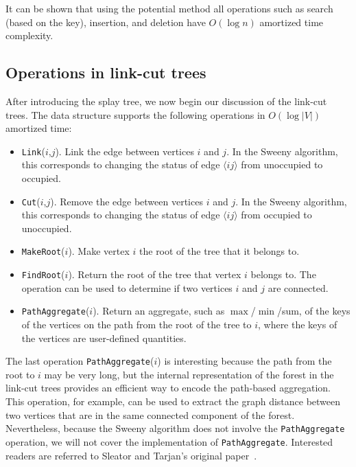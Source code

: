 It can be shown that using the potential method \cite{Leiserson1994} all operations such as search (based on the key), insertion, and deletion have $O(\log n)$ 
amortized time complexity\cite{Sleator1985}.

\subsection{Operations in link-cut trees}
After introducing the splay tree, we now begin our discussion of the link-cut trees. The data structure supports the following operations in $O(\log |V|)$ amortized time:
\begin{itemize}
  \item \texttt{Link}($i$,$j$). Link the edge between vertices $i$ and $j$. In the Sweeny algorithm, this corresponds to changing the status of edge 
  $\langle ij \rangle$ from unoccupied to occupied.
  \item \texttt{Cut}($i$,$j$).  Remove the edge between vertices $i$ and $j$. In the Sweeny algorithm, this corresponds to changing the status of edge 
  $\langle ij \rangle$ from occupied to unoccupied.
  \item \texttt{MakeRoot}($i$).  Make vertex $i$ the root of the tree that it belongs to.
  \item \texttt{FindRoot}($i$).  Return the root of the tree that vertex $i$ belongs to. The operation can be used to determine if two vertices $i$ and $j$ are connected.
  \item \texttt{PathAggregate}($i$). Return an aggregate, such as $\max$/$\min$/sum, of the keys of the vertices on the path from the root of the tree to $i$, 
  where the keys of the vertices are user-defined quantities.
\end{itemize}
The last operation \texttt{PathAggregate}($i$) is interesting because the path from the root to $i$ may be very long, but the internal
representation of the forest in the link-cut trees provides an efficient way to encode the path-based aggregation.
This operation, for example, can be used to extract the graph distance between two vertices that are in the same connected component of the forest.
Nevertheless, because the Sweeny algorithm does not involve the \texttt{PathAggregate} operation, we will
not cover the implementation of \texttt{PathAggregate}. Interested readers are referred to Sleator and Tarjan's original paper~.

